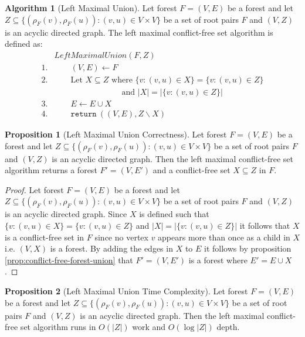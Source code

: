 \documentclass[a4paper,12pt]{article}
\theoremstyle{definition}
\newtheorem{proposition}{Proposition}[section]
\newtheorem{algorithm}{Algorithm}[section]
\newcommand{\id}[1]{\ensuremath{\mathit{#1}}}
\newcommand{\kw}[1]{\ensuremath{\mathtt{#1}}}
\begin{document}
\begin{algorithm}[Left Maximal Union]\label{alg:left-maximal-union}
    Let forest $F = (V, E)$ be a forest and let $Z \subseteq \{(\rho_F(v),
    \rho_F(u)) : (v, u) \in V \times V\}$ be a set of root pairs $F$ and $(V,
    Z)$ is an acyclic directed graph. The left maximal conflict-free set
    algorithm is defined as:
    \begin{align*}
        & \id{LeftMaximalUnion}(F, Z) \\ 
        1. & \qquad (V, E) \leftarrow F \\
        2. & \qquad \text{Let } X \subseteq Z \text{ where } \{v : (v, u) \in X\} = \{v : (v, u) \in Z\} \\
        & \qquad \qquad \qquad \quad \: \: \: 
        \: \text{ and } |X| = |\{v : (v, u) \in Z\}| \\
        3. & \qquad E \leftarrow E \cup X \\
        4. & \qquad \kw{return} \: ((V, E), Z \backslash X)
    \end{align*}
\end{algorithm}
\begin{proposition}[Left Maximal Union Correctness]\label{prop:left-maximal-union-correctness}
    Let forest $F = (V, E)$ be a forest and let $Z \subseteq \{(\rho_F(v),
    \rho_F(u)) : (v, u) \in V \times V\}$ be a set of root pairs $F$ and $(V,
    Z)$ is an acyclic directed graph. Then the left maximal conflict-free set
    algorithm returns a forest $F' = (V, E')$ and a conflict-free set $X
    \subseteq Z$ in $F$.
\end{proposition}
\begin{proof}
    Let forest $F = (V, E)$ be a forest and let $Z \subseteq \{(\rho_F(v),
    \rho_F(u)) : (v, u) \in V \times V\}$ be a set of root pairs $F$ and $(V,
    Z)$ is an acyclic directed graph. Since $X$ is defined such that $\{v : (v,
    u) \in X\} = \{v : (v, u) \in Z\}$ and $|X| = |\{v : (v, u) \in Z\}|$ it
    follows that $X$ is a conflict-free set in $F$ since no vertex $v$ appears
    more than once as a child in $X$ i.e. $(V, X)$ is a forest. By adding the
    edges in $X$ to $E$ it follows by proposition
    \ref{prop:conflict-free-forest-union} that $F' = (V, E')$ is a forest where
    $E' = E \cup X$.
\end{proof}

\begin{proposition}[Left Maximal Union Time Complexity]
    Let forest $F = (V, E)$ be a forest and let $Z \subseteq \{(\rho_F(v),
    \rho_F(u)) : (v, u) \in V \times V\}$ be a set of root pairs $F$ and $(V,
    Z)$ is an acyclic directed graph. Then the left maximal conflict-free set
    algorithm runs in $O(|Z|)$ work and $O(\log |Z|)$ depth.
\end{proposition}
\end{document}
